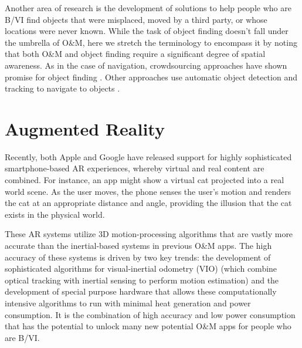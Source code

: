 \documentclass[chi_draft]{sigchi}
\newcommand{\BVI}{B/VI\xspace}
\newcommand{\OM}{O\&M\xspace}
\begin{document}
Another area of research is the development of solutions to help people who are \BVI find objects that were misplaced, moved by a third party, or whose locations were never known.  While the task of object finding doesn't fall under the umbrella of \OM, here we stretch the terminology to encompass it by noting that both \OM and object finding require a significant degree of spatial awareness.  As in the case of navigation, crowdsourcing approaches have shown promise for object finding \cite{bigham2010vizwizlocateit}.  Other approaches use automatic object detection and tracking to navigate to objects \cite{schauerte2012assistive, jafri2014computer, thakoor2014system}.%

\section{Augmented Reality}
%

Recently, both Apple and Google have released support for highly sophisticated smartphone-based AR experiences, whereby virtual and real content are combined.  For instance, an app might show a virtual cat projected into a real world scene.  As the user moves, the phone senses the user's motion and renders the cat at an appropriate distance and angle, providing the illusion that the cat exists in the physical world.

These AR systems utilize 3D motion-processing algorithms that are vastly more accurate than the inertial-based systems in previous \OM apps.  The high accuracy of these systems is driven by two key trends: the development of sophisticated algorithms for visual-inertial odometry (VIO) \cite{li2013high,leutenegger2015keyframe,bloesch2015robust,forster2014svo} (which combine optical tracking with inertial sensing to perform motion estimation) and the development of special purpose hardware that allows these computationally intensive algorithms to run with minimal heat generation and power consumption.  It is the combination of high accuracy and low power consumption that has the potential to unlock many new potential \OM apps for people who are \BVI.
\end{document}
